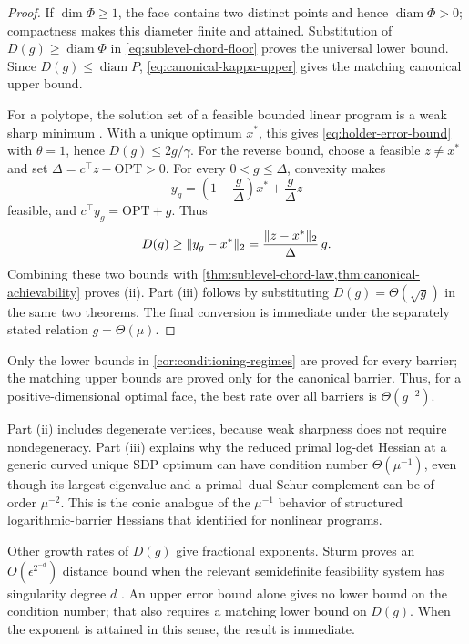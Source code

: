 \begin{proof}
If $\dim\Phi\geq1$, the face contains two distinct points and hence
$\operatorname{diam}\Phi>0$; compactness makes this diameter finite and
attained.
Substitution of $D(g)\geq\operatorname{diam}\Phi$ in
\eqref{eq:sublevel-chord-floor} proves the universal lower bound.  Since
$D(g)\leq\operatorname{diam}P$, \eqref{eq:canonical-kappa-upper} gives the
matching canonical upper bound.

For a polytope, the solution set of a feasible bounded linear program is a
weak sharp minimum
\cite{mangasarian1979-nonlinear-perturbation-linear-programs,burke1993-weak-sharp-minima}.
With a unique optimum $x^*$, this gives \eqref{eq:holder-error-bound} with
$\theta=1$, hence $D(g)\leq2g/\gamma$.  For the reverse bound, choose a
feasible $z\ne x^*$ and set
$\Delta=c^\top z-\mathrm{OPT}>0$.  For every $0<g\leq\Delta$, convexity makes
\[
 y_g=\left(1-\frac g\Delta\right)x^*+\frac g\Delta z
\]
feasible, and $c^\top y_g=\mathrm{OPT}+g$.  Thus
\[
 D(g)\geq\lVert y_g-x^*\rVert_2
 =\frac{\lVert z-x^*\rVert_2}{\Delta}\,g.
\]
Combining these two bounds with
\cref{thm:sublevel-chord-law,thm:canonical-achievability} proves (ii).
Part (iii) follows by substituting
$D(g)=\Theta(\sqrt g)$ in the same two theorems.  The final conversion is
immediate under the separately stated relation $g=\Theta(\mu)$.
\end{proof}

\begin{remark}
Only the lower bounds in \cref{cor:conditioning-regimes} are proved for
every barrier; the matching upper bounds are proved only for the canonical
barrier.  Thus, for a positive-dimensional optimal face, the best rate over
all barriers is $\Theta(g^{-2})$.
\end{remark}

Part (ii) includes degenerate vertices, because weak sharpness does not
require nondegeneracy.  Part (iii) explains why the reduced primal log-det
Hessian at a generic curved unique SDP optimum can have condition number
$\Theta(\mu^{-1})$, even though its largest eigenvalue and a primal--dual
Schur complement can be of order $\mu^{-2}$.  This is the conic analogue of
the $\mu^{-1}$ behavior of structured logarithmic-barrier Hessians that
\citet{wright1994-properties-hessian-logarithmic-barrier} identified for
nonlinear programs.

Other growth rates of $D(g)$ give fractional exponents.  Sturm proves an
$O(\epsilon^{2^{-d}})$ distance bound when the relevant semidefinite
feasibility system has singularity degree $d$
\cite{sturm2000-error-bounds-linear-matrix-inequalities}.  An upper error
bound alone gives no lower bound on the condition number; that also requires
a matching lower bound on $D(g)$.  When the exponent is attained in this
sense, the result is immediate.


